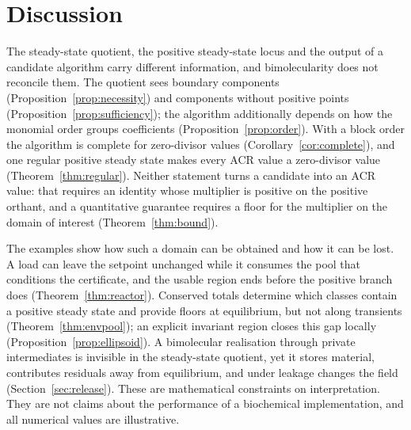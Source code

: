 \documentclass[11pt,a4paper]{article}
\theoremstyle{plain}
\theoremstyle{definition}
\theoremstyle{remark}
\begin{document}
\section{Discussion}\label{sec:discussion}

The steady-state quotient, the positive steady-state locus and the output of a candidate algorithm carry different information, and bimolecularity does not reconcile them. The quotient sees boundary components (Proposition~\ref{prop:necessity}) and components without positive points (Proposition~\ref{prop:sufficiency}); the algorithm additionally depends on how the monomial order groups coefficients (Proposition~\ref{prop:order}). With a block order the algorithm is complete for zero-divisor values (Corollary~\ref{cor:complete}), and one regular positive steady state makes every ACR value a zero-divisor value (Theorem~\ref{thm:regular}). Neither statement turns a candidate into an ACR value: that requires an identity whose multiplier is positive on the positive orthant, and a quantitative guarantee requires a floor for the multiplier on the domain of interest (Theorem~\ref{thm:bound}).

The examples show how such a domain can be obtained and how it can be lost. A load can leave the setpoint unchanged while it consumes the pool that conditions the certificate, and the usable region ends before the positive branch does (Theorem~\ref{thm:reactor}). Conserved totals determine which classes contain a positive steady state and provide floors at equilibrium, but not along transients (Theorem~\ref{thm:envpool}); an explicit invariant region closes this gap locally (Proposition~\ref{prop:ellipsoid}). A bimolecular realisation through private intermediates is invisible in the steady-state quotient, yet it stores material, contributes residuals away from equilibrium, and under leakage changes the field (Section~\ref{sec:release}). These are mathematical constraints on interpretation. They are not claims about the performance of a biochemical implementation, and all numerical values are illustrative.
\end{document}

